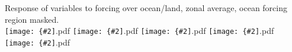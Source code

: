 \documentclass[12pt,a4paper]{article}
\newcommand{\pdffig}[2][0.5]{\texttt{[image: \{\#2]}.pdf}}
\begin{document}
\section{}
Response of variables to forcing over ocean/land, zonal average, ocean forcing 
region masked.\\

\pdffig[1.0]{zon_temp}
\pdffig[1.0]{zon_rh}
\pdffig[1.0]{zon_rad}
\pdffig[1.0]{zon_cldprc}
\pdffig[1.0]{zon_flux}
\end{document}
